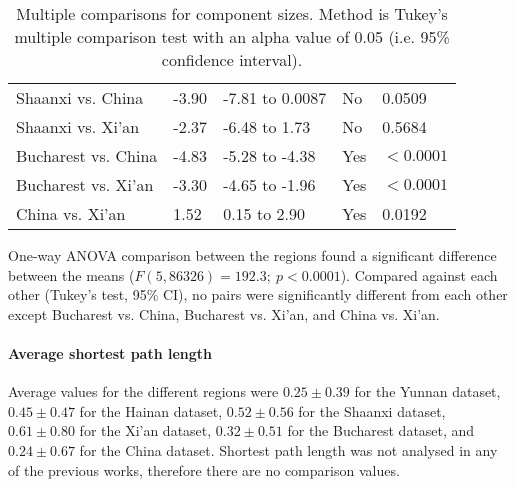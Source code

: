 \begin{table}[htbp]
\begin{mdframed}
\begin{tabular*}{\linewidth}{l|llll}
			Shaanxi vs. China & -3.90 & -7.81 to 0.0087 & No & 0.0509\\
			Shaanxi vs. Xi'an & -2.37 & -6.48 to 1.73 & No & 0.5684\\
			Bucharest vs. China & -4.83 & -5.28 to -4.38 & Yes & $<0.0001$\\
			Bucharest vs. Xi'an & -3.30 & -4.65 to -1.96 & Yes & $<0.0001$\\
			China vs. Xi'an & 1.52 & 0.15 to 2.90 & Yes & 0.0192\\
			\hline
		\end{tabular*}
		\caption{Multiple comparisons for component sizes. Method is Tukey's multiple comparison test with an alpha value of 0.05 (i.e. 95\% confidence interval).}
		\label{tab:component_size_tukey}
	\end{mdframed}
\end{table}

One-way ANOVA comparison between the regions found a significant difference between the means ($F(5,86326) = 192.3; \: p<0.0001$). Compared against each other (Tukey's test, 95\% CI), no pairs were significantly different from each other except Bucharest vs. China, Bucharest vs. Xi'an, and China vs. Xi'an.

\paragraph{Average shortest path length} Average values for the different regions were $0.25\pm0.39$ for the Yunnan dataset, $0.45\pm0.47$ for the Hainan dataset, $0.52\pm0.56$ for the Shaanxi dataset, $0.61\pm0.80$ for the Xi'an dataset, $0.32\pm0.51$ for the Bucharest dataset, and $0.24\pm0.67$ for the China dataset. Shortest path length was not analysed in any of the previous works, therefore there are no comparison values.

